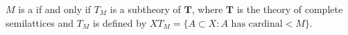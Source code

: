 $M$ is a  if and only if $T_M$ is a subtheory of $\mathbf{T}$, where $\mathbf{T}$ is the theory of complete semilattices and $T_M$ is defined by $XT_M = \{A \subset X : A \text{ has cardinal} < M\}$.
